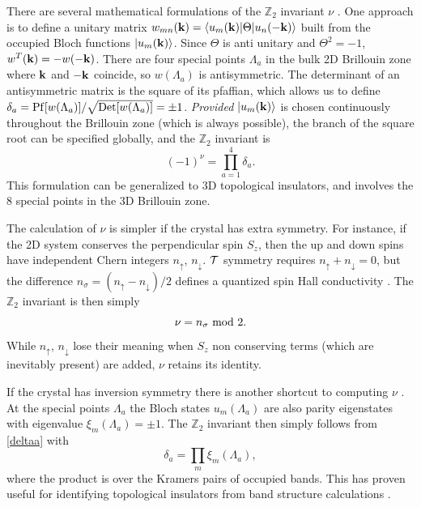 \documentclass[twocolumn,floatfix,showpacs,rmp,aps]{revtex4}
\begin{document}
	There are several mathematical formulations of the $\mathbb{Z}_2$ invariant $\nu$
	\cite{kanemele05b,fukane06,moorebalents07,fukane07,fukui07,fukui08,qihugheszhang08,roy09a,wang09}.  One
	approach \cite{fukane06} is to define a unitary matrix
	$w_{mn}({\bf k}) = \langle u_m({\bf k})|\Theta|u_n(-{\bf k})\rangle$
	built from the occupied Bloch functions
	$|u_m({\bf k})\rangle$.  Since $\Theta$ is anti unitary
	and $\Theta^2=-1$, $w^T({\bf k}) = - w(-{\bf k})$.  There are four
	special points $\Lambda_a$ in the bulk 2D Brillouin zone where ${\bf k}$ and
	$-{\bf k}$ coincide, so $w(\Lambda_a)$ is
	antisymmetric.  The determinant of an antisymmetric matrix is the square of
	its pfaffian, which allows us to define
	$\delta_a = {\rm Pf}[w(\Lambda_a)]/\sqrt{{\rm Det}[w(\Lambda_a)]} = \pm 1$.
	{\it Provided} $|u_m({\bf k})\rangle$ is chosen continuously
	throughout the Brillouin zone (which is always possible), the branch
	of the square root can be specified globally, and the $\mathbb{Z}_2$
	invariant is
	\begin{equation}
		(-1)^\nu = \prod_{a=1}^4 \delta_a.
		\label{deltaa}
	\end{equation}
	This formulation can be
	generalized to 3D topological insulators, and involves
	the 8 special points in the 3D Brillouin zone.
	
	The calculation of $\nu$ is simpler
	if the crystal has extra symmetry.  For instance, if the 2D system
	conserves the perpendicular spin $S_z$, then the
	up and down spins have independent
	Chern integers $n_\uparrow$, $n_\downarrow$.
	${\cal T}$ symmetry requires $n_\uparrow+n_\downarrow = 0$, but
	the difference $n_\sigma = (n_\uparrow-n_\downarrow)/2$ defines a quantized spin
	Hall conductivity \cite{sheng06}.  The $\mathbb{Z}_2$ invariant is then simply
	\begin{equation}
		\nu = n_\sigma \ {\rm mod} \ 2.
	\end{equation}
	While $n_\uparrow$, $n_\downarrow$ lose
	their meaning when $S_z$ non conserving terms (which
	are inevitably present) are added, $\nu$ retains its identity.
	
	If the crystal has inversion symmetry there is another shortcut to
	computing $\nu$ \cite{fukane07}.  At the special points $\Lambda_a$
	the Bloch states $u_m(\Lambda_a)$ are also parity eigenstates with eigenvalue
	$\xi_m(\Lambda_a)=\pm 1$.  The $\mathbb{Z}_2$ invariant then simply
	follows from \eqref{deltaa} with
	\begin{equation}
		\delta_a = \prod_{m} \xi_m(\Lambda_a),
		\label{parityz2}
	\end{equation}
	where the product is over the Kramers pairs of occupied bands.
	This has proven useful for identifying
	topological insulators from band structure calculations
	\cite{fukane07,teofukane08,zhangh09,pesin10,guo09}.
	
\end{document}
